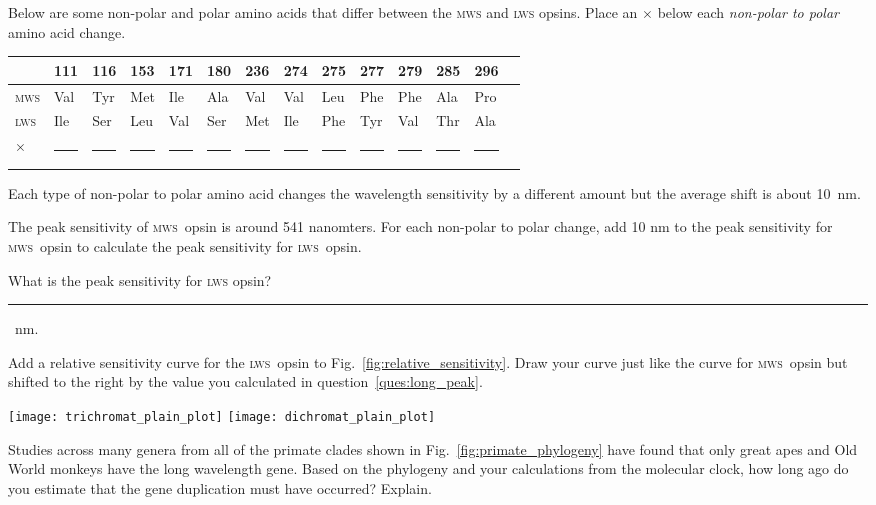 \documentclass[12pt, addpoints]{exam}
\newcommand{\mws}{\textsc{mws}}
\newcommand{\lws}{\textsc{lws}}
\begin{document}
\begin{questions}
\bigskip

\question[1]
Below are some non-polar and polar amino acids that differ between the \mws{} and \lws{} opsins. Place an {\large $\times$} below each \textit{non-polar to polar} amino acid change.

\begin{tabular}{@{}*{14}{l}@{}}
\toprule
 & 111 & 116 & 153 & 171 & 180 & 236 & 274 & 275 & 277 & 279 & 285 & 296 \tabularnewline
\midrule
\textsc{mws} & Val & Tyr & Met & Ile & Ala & Val & Val & Leu & Phe & Phe & Ala & Pro \tabularnewline
\textsc{lws} & Ile & Ser & Leu & Val & Ser & Met & Ile & Phe & Tyr & Val & Thr & Ala \tabularnewline
\midrule\noalign{\medskip}
 {\Large $\times$} 	   & \rule{0.5cm}{0.4pt}
 & \rule{0.5cm}{0.4pt} & \rule{0.5cm}{0.4pt}
 & \rule{0.5cm}{0.4pt} & \ifprintanswers{\large $\times$}\else\rule{0.5cm}{0.4pt}\fi
 & \rule{0.5cm}{0.4pt} & \rule{0.5cm}{0.4pt} 
 & \rule{0.5cm}{0.4pt} & \ifprintanswers{\large $\times$}\else\rule{0.5cm}{0.4pt}\fi 
 & \rule{0.5cm}{0.4pt} & \ifprintanswers{\large $\times$}\else\rule{0.5cm}{0.4pt}\fi  
 & \rule{0.5cm}{0.4pt} \tabularnewline
\bottomrule
\end{tabular}

Each type of non-polar to polar amino acid changes the wavelength sensitivity by a different amount but the average shift is about 10~nm.


\question[1]\label{ques:long_peak}
The peak sensitivity of \mws{}~opsin is around 541 nanomters. For each non-polar to polar change, add 10 nm to the peak sensitivity for \mws{}~opsin to calculate the peak sensitivity for \lws{}~opsin.

\medskip

What is the peak sensitivity for \lws{} opsin? \rule{1in}{0.4pt}~nm.
 
\question[1]
Add a relative sensitivity curve for the \lws{}~opsin to Fig.~\ref{fig:relative_sensitivity}. Draw your curve just like the curve for \mws{}~opsin but shifted to the right by the value you calculated in question~\ref{ques:long_peak}.

\parbox{\linewidth}{
\ifprintanswers
	\texttt{[image: trichromat\_plain\_plot]}
\else
	\texttt{[image: dichromat\_plain\_plot]}
\fi
{}\label{fig:relative_sensitivity}\par
}

\newpage


\question[3]
Studies across many genera from all of the primate clades shown in Fig.~\ref{fig:primate_phylogeny} have found that only great apes and Old World monkeys have the long wavelength gene. Based on the phylogeny and your calculations from the molecular clock, how long ago do you estimate that the gene duplication must have occurred?  Explain.


\end{questions}
\end{document}
